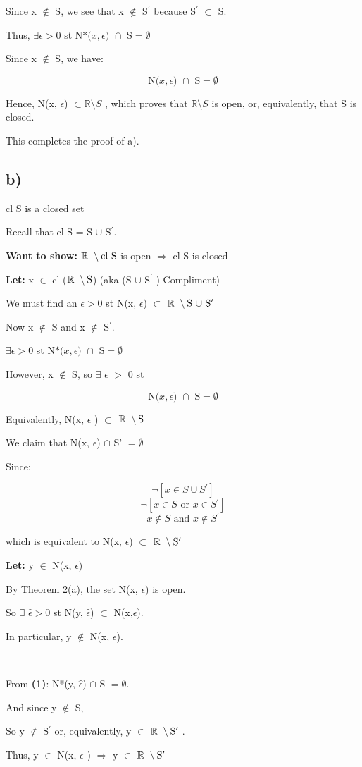 \documentclass{article}
\newcommand{\mt}[1]{\ensuremath{#1}}
\newcommand\ssc[2][\DefaultOpt]{%
  \def\DefaultOpt{#2}%
  \subsection[#1]{#2}%
}
\newcommand{\lt}[1]{\textbf{Let: } #1}
\newcommand{\wts}[1]{\textbf{Want to show: } #1}
\newcommand{\bpth}[1]{\textbf{(#1)}}
\newcommand{\step}[2]{\begin{equation}\tag{#2}#1\end{equation}}
\newcommand{\br}{\mt{\mathbb{R}} }       %
\newcommand{\ep}{\mt{\epsilon} }         %
\newcommand{\mem}{\mt{\in} }
\newcommand{\exs}{\mt{\exists} }
\newcommand{\sbs}{\mt{\subset} }         %
\newcommand{\rar}{ \mt{\Rightarrow} }     %
\newcommand{\pr}{\mt{^\prime} } 		   %
\newcommand{\bnm}[2]{\mt{#1\setminus{#2}}}
\newcommand{\bnt}[2]{\mt{\textrm{#1}\setminus{\textrm{#2}}}}
\newcommand{\nbhe}[3]{\textrm{N(}#1, #2\textrm{) }\cap \textrm{ #3} = \emptyset}
\newcommand{\dnbhe}[3]{\textrm{N*(}#1, #2\textrm{) }\cap \textrm{ #3} = \emptyset}
\begin{document}
Since x $\not\in$ S, we see that x $\not\in$ S\pr because S\pr \sbs S.

Thus, $\exists \ep > 0$ st $\dnbhe{x}{\epsilon}{S}$ \

Since x $\not\in$ S, we have:

\step{\nbhe{x}{\epsilon}{S}}{1}

Hence, N(x, $\ep$) $\sbs \bnm{\br}{S}$ , which proves that $\bnm{\br}{S}$ is open, or, equivalently, that S is closed. \

This completes the proof of a).

\ssc{b)}
cl S is a closed set \

Recall that cl S = S $\cup$ S$\pr$.

\wts{$\bnt{\br}{cl S}$ is open \rar cl S is closed}

\lt{x \mem cl (\bnt{\br}{S}) (aka (S $\cup$ S\pr) Compliment)} \

We must find an $\ep > 0$ st N(x, $\ep$) \sbs \bnt{\br}{S $\cup$ S\pr} \

Now x $\not\in$ S and x $\not\in$ S$\pr$. \

$\exists \ep > 0$ st $\dnbhe{x}{\epsilon}{S}$ \

However, x $\not\in$ S, so \exs \ep $>$ 0 st \

\step{\nbhe{x}{\epsilon}{S}}{1}

Equivalently, N(x, \ep) \sbs \bnt{\br}{S}

We claim that N(x, $\ep$) $\cap$ S' $= \emptyset$ \

Since:

\[\neg [x \in S \cup S\pr]\]
\[\neg [x \in S \textrm{ or }x \in S\pr]\]
\[x \not\in S \textrm{ and }x \not\in S\pr\]

which is equivalent to N(x, $\ep$) \sbs \bnt{\br}{S\pr} \

\lt{y $\in$ N(x, $\ep$)}

By Theorem 2(a), the set N(x, $\ep$) is open. \

So \exs $\hat{\epsilon} > 0$ st N(y, $\hat{\epsilon}$) $\subset$ N(x,$\ep$). \

In particular, y $\not\in$ N(x, $\ep$). \

\

From \bpth{1}: N*(y, $\hat{\epsilon}$) $\cap$ S $= \emptyset$. \

And since y $\not\in$ S, %

So y $\not\in$ S$\pr$ or, equivalently, y \mem \bnt{\br}{S\pr}.

Thus, y \mem N(x, \ep) \rar y \mem \bnt{\br}{S\pr}
\end{document}
